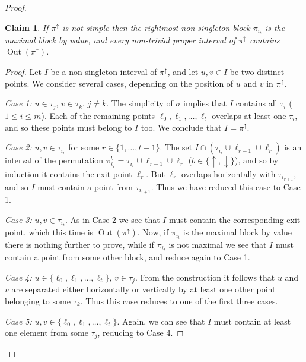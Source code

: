 \documentclass[11pt]{article}
\newtheorem*{claim}{Claim}
\begin{document}
\begin{proof}
\begin{claim}
If $\pi^\uparrow$ is not simple then the rightmost non-singleton block $\pi_{i_t}$ is the maximal block by value,
and every non-trivial proper interval of $\pi^\uparrow$ contains ${\operatorname{Out}}(\pi^\uparrow)$.
\end{claim}

\begin{proof}
Let $I$ be a non-singleton interval of $\pi^\uparrow$, and let $u,v\in I$ be two distinct points.
We consider several cases, depending on the position of $u$ and $v$ in $\pi^\uparrow$.

\textit{Case 1:} $u\in \tau_j$, $v\in \tau_k$, $j\neq k$.
The simplicity of $\sigma$ implies that $I$ contains all $\tau_i$ ($1\leq i\leq m$).
Each of the remaining points $\ell_0,\ell_1,\ldots,\ell_t$ overlaps at least one
$\tau_i$, and so these points must belong to $I$ too. We conclude that $I=\pi^\uparrow$.
{\vspace{2mm}}

\textit{Case 2:} $u,v\in\tau_{i_r}$ for some $r\in\{1,\ldots,t-1\}$.
The set $I\cap(\tau_{i_r}\cup\ell_{r-1}\cup\ell_r)$ is an interval of the permutation $\pi_{i_r}^b = \tau_{i_r}\cup\ell_{r-1}\cup\ell_r$ ($b\in\{\uparrow,\downarrow\}$), and so by induction it contains the exit point $\ell_r$.
But $\ell_r$ overlaps horizontally with $\tau_{i_{r+1}}$, and so $I$ must contain a point from $\tau_{i_{r+1}}$.
Thus we have reduced this case to Case 1.
{\vspace{2mm}}

\textit{Case 3:}  $u,v\in\tau_{i_t}$. As in Case 2 we see that $I$ must contain the corresponding exit point,
which this time is ${\operatorname{Out}}(\pi^\uparrow)$. Now, if $\pi_{i_t}$ is the maximal block by value there is nothing further to prove, while if $\pi_{i_t}$ is not maximal we see that $I$ must contain a point from some other block, and reduce again to Case 1.
{\vspace{2mm}}

\textit{Case 4:}
$u\in \{\ell_0,\ell_1,\ldots,\ell_{t}\}$, $v\in \tau_j$.
From the construction it follows that $u$ and $v$ are separated either horizontally or vertically by at least one other point belonging to some $\tau_k$. Thus this case reduces to one of the first three cases.
{\vspace{2mm}}

\textit{Case 5:}
$u,v \in \{\ell_0,\ell_1,\ldots,\ell_{t}\}$.
Again, we can see that $I$ must contain at least one element from some $\tau_j$, reducing to Case 4.
\end{proof}


\end{proof}
\end{document}
